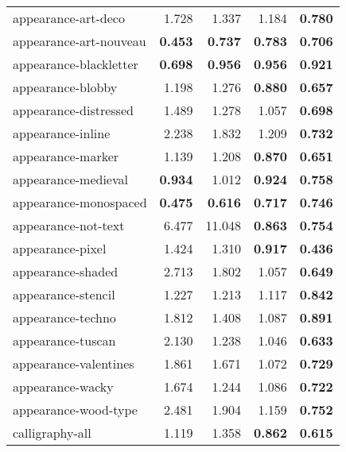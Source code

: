 \begin{longtable}{|l|r|r|r|r|}
appearance-art-deco       & 1.728          & 1.337          & 1.184          & \textbf{0.780} \\
appearance-art-nouveau    & \textbf{0.453} & \textbf{0.737} & \textbf{0.783} & \textbf{0.706} \\
appearance-blackletter    & \textbf{0.698} & \textbf{0.956} & \textbf{0.956} & \textbf{0.921} \\
appearance-blobby         & 1.198          & 1.276          & \textbf{0.880} & \textbf{0.657} \\
appearance-distressed     & 1.489          & 1.278          & 1.057          & \textbf{0.698} \\
appearance-inline         & 2.238          & 1.832          & 1.209          & \textbf{0.732} \\
appearance-marker         & 1.139          & 1.208          & \textbf{0.870} & \textbf{0.651} \\
appearance-medieval       & \textbf{0.934} & 1.012          & \textbf{0.924} & \textbf{0.758} \\
appearance-monospaced     & \textbf{0.475} & \textbf{0.616} & \textbf{0.717} & \textbf{0.746} \\
appearance-not-text       & 6.477          & 11.048         & \textbf{0.863} & \textbf{0.754} \\
appearance-pixel          & 1.424          & 1.310          & \textbf{0.917} & \textbf{0.436} \\
appearance-shaded         & 2.713          & 1.802          & 1.057          & \textbf{0.649} \\
appearance-stencil        & 1.227          & 1.213          & 1.117          & \textbf{0.842} \\
appearance-techno         & 1.812          & 1.408          & 1.087          & \textbf{0.891} \\
appearance-tuscan         & 2.130          & 1.238          & 1.046          & \textbf{0.633} \\
appearance-valentines     & 1.861          & 1.671          & 1.072          & \textbf{0.729} \\
appearance-wacky          & 1.674          & 1.244          & 1.086          & \textbf{0.722} \\
appearance-wood-type      & 2.481          & 1.904          & 1.159          & \textbf{0.752} \\
calligraphy-all           & 1.119          & 1.358          & \textbf{0.862} & \textbf{0.615} \\

\end{longtable}
